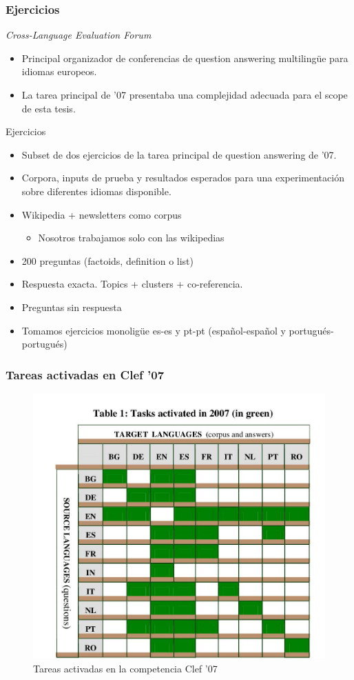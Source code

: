\begin{frame}
\frametitle{Ejercicios}
  \textit{Cross-Language Evaluation Forum}
  \begin{itemize}
    \item Principal organizador de conferencias de question answering multilingüe para idiomas europeos.
    \item La tarea principal de '07 presentaba una complejidad adecuada para el scope de esta tesis.
  \end{itemize}
  Ejercicios
  \begin{itemize}
    \item Subset de dos ejercicios de la tarea principal de question answering de '07. 
    \item Corpora, inputs de prueba y resultados esperados para una experimentación sobre diferentes idiomas disponible.
    \item Wikipedia + newsletters como corpus
    \begin{itemize}
      \item Nosotros trabajamos solo con las wikipedias
    \end{itemize}
    \item 200 preguntas (factoids, definition o list)
    \item Respuesta exacta. Topics + clusters + co-referencia.
    \item Preguntas sin respuesta
    \item Tomamos ejercicios monoligüe es-es y pt-pt (español-español y portugués-portugués)
  \end{itemize}
\end{frame}


\begin{frame}
  \frametitle{Tareas activadas en Clef '07}
  \begin{figure}
      \includegraphics[scale=0.4]{graficos/clef07}
    \caption{Tareas activadas en la competencia Clef '07}
    \label{fig:tareas}
  \end{figure}
\end{frame}

